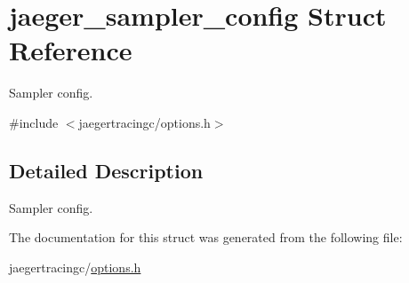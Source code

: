 \hypertarget{structjaeger__sampler__config}{}\section{jaeger\+\_\+sampler\+\_\+config Struct Reference}
\label{structjaeger__sampler__config}


Sampler config.  




{\ttfamily \#include $<$jaegertracingc/options.\+h$>$}



\subsection{Detailed Description}
Sampler config. 



The documentation for this struct was generated from the following file\+:\begin{DoxyCompactItemize}
\item 
jaegertracingc/\mbox{\hyperlink{options_8h}{options.\+h}}\end{DoxyCompactItemize}
